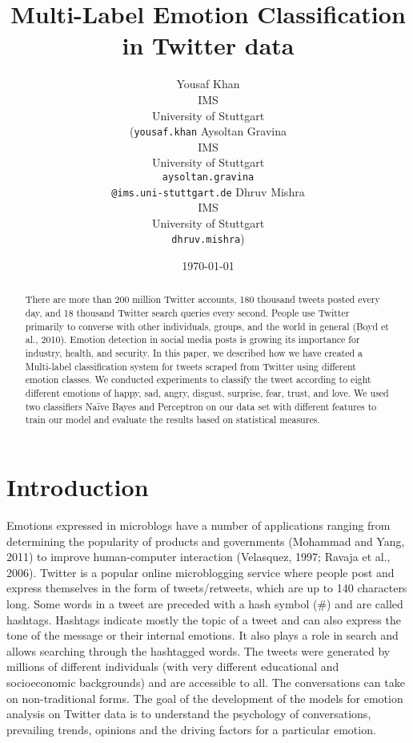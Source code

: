 \documentclass[11pt]{article}
\title{  Multi-Label Emotion Classification in Twitter data
  }
\author{
  Yousaf Khan\\
  IMS\\
  University of Stuttgart\\
  (\texttt{yousaf.khan}
  \And
  Aysoltan Gravina\\
  IMS\\
  University of Stuttgart\\
    \texttt{aysoltan.gravina}\\
    \texttt{@ims.uni-stuttgart.de}
    \And
  Dhruv Mishra\\
  IMS\\
  University of Stuttgart\\
    \texttt{dhruv.mishra})
  }
\date{\today}
\begin{document}
  \maketitle
  \begin{abstract}
  There are more than 200 million Twitter accounts, 180 thousand tweets posted every day, and 18 thousand Twitter search queries every second. People use Twitter primarily to converse with other individuals, groups, and the world in general (Boyd et al., 2010). Emotion detection in social media posts is growing its importance for industry, health, and security.
  In this paper, we described how we have created a Multi-label classification system for tweets scraped from Twitter using different emotion classes. We conducted experiments to classify the tweet according to eight different emotions of happy, sad, angry, disgust, surprise, fear, trust, and love. We used two classifiers Naïve Bayes and Perceptron on our data set with different features to train our model and evaluate the results based on statistical measures.
  
  
  \end{abstract}
  
  
  
  \section{Introduction}
  
  Emotions expressed in microblogs have a number of applications ranging from determining the popularity of products and governments (Mohammad and Yang, 2011) to improve human-computer interaction (Velasquez, 1997; Ravaja et al., 2006).
    Twitter is a popular online microblogging service where people post and express themselves in the form of tweets/retweets, which are up to 140 characters long. Some words in a tweet are preceded with a hash symbol (\#) and are called hashtags. Hashtags indicate mostly the topic of a tweet and can also express the tone of the message or their internal emotions. It also plays a role in search and allows searching through the hashtagged words.
    The tweets were generated by millions of different individuals (with very different educational and socioeconomic backgrounds) and are accessible to all. The conversations can take on non-traditional forms. The goal of the development of the models for emotion analysis on Twitter data is to understand the psychology of conversations, prevailing trends, opinions and the driving factors for a particular emotion.
  
\end{document}

